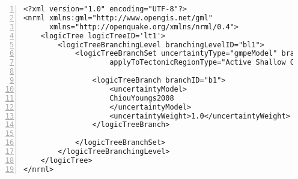 \begin{Verbatim}[frame=single, commandchars=\\\{\}, fontsize=\small,
    firstnumber=1, numbers=left, numbersep=2pt]
<?xml version="1.0" encoding="UTF-8"?>
<nrml xmlns:gml="http://www.opengis.net/gml"
      xmlns="http://openquake.org/xmlns/nrml/0.4">
    <logicTree logicTreeID='lt1'>
        <logicTreeBranchingLevel branchingLevelID="bl1">
            <logicTreeBranchSet uncertaintyType="gmpeModel" branchSetID="bs1"
                    applyToTectonicRegionType="Active Shallow Crust">

                <logicTreeBranch branchID="b1">
                    <uncertaintyModel>
                    ChiouYoungs2008
                    </uncertaintyModel>
                    <uncertaintyWeight>1.0</uncertaintyWeight>
                </logicTreeBranch>

            </logicTreeBranchSet>
        </logicTreeBranchingLevel>
    </logicTree>
</nrml>
\end{Verbatim}
